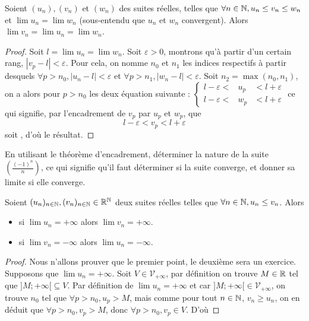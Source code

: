 \begin{them}[Encadrement]
    Soient $(u_n),(v_n)$ et $(w_n)$ des suites réelles, telles que $\forall n\in\mathbb{N}, u_n \leq v_n \leq w_n$ et $\lim u_n = \lim w_n$ (sous-entendu que $u_n$ et $w_n$ convergent). Alors $\lim v_n = \lim u_n = \lim w_n$.
\end{them}

\begin{proof}
    Soit $l = \lim u_n = \lim w_n$. Soit $\varepsilon > 0$, montrons qu'à partir d'un certain rang, $|v_p - l| < \varepsilon$. Pour cela, on nomme $n_0$ et $n_1$ les indices respectifs à partir desquels $\forall p > n_0, |u_n - l| < \varepsilon$ et $\forall p > n_1, |w_n - l| < \varepsilon$. Soit $n_2 = \max(n_0,n_1)$, on a alors pour $p > n_0$ les deux équation suivante : $\left\{\begin{array}{rcl}
        l-\varepsilon <& u_p &< l+\varepsilon\\
        l-\varepsilon <& w_p &< l+\varepsilon 
    \end{array}\right.$ ce qui signifie, par l'encadrement de $v_p$ par $u_p$ et $w_p$, que $$l-\varepsilon < v_p < l+\varepsilon$$ soit , d'où le résultat.
\end{proof}

\begin{exo}
    En utilisant le théorème d'encadrement, déterminer la nature de la suite $\displaystyle{\left(\frac{(-1)^n}{n}\right)}$, ce qui signifie qu'il faut déterminer si la suite converge, et donner sa limite si elle converge.
\end{exo}

\begin{them}
    Soient $(u_n)_{n\in\mathbb{N}},(v_n)_{n\in\mathbb{N}}\in\mathbb{R}^{\mathbb{N}}$ deux suites réelles telles que $\forall n\in\mathbb{N},u_n \leq v_n$. Alors
    \begin{itemize}[label=$\bullet$]
        \item si $\lim u_n = +\infty$ alors $\lim v_n = +\infty$.
        \item si $\lim v_n = -\infty$ alors $\lim u_n = -\infty$.
    \end{itemize}
\end{them}

\begin{proof}
    Nous n'allons prouver que le premier point, le deuxième sera un exercice. Supposons que $\lim u_n = +\infty$. Soit $V\in\mathcal V_{+\infty}$, par définition on trouve $M\in\mathbb{R}$ tel que $]M;+\infty[\subseteq V$. Par définition de $\lim u_n = +\infty$ et car $]M;+\infty[\in\mathcal V_{+\infty}$, on trouve $n_0$ tel que $\forall p > n_0, u_p > M$, mais comme pour tout $n\in\mathbb{N}$, $v_n\geq u_n$, on en déduit que $\forall p > n_0, v_p > M$, donc $\forall p > n_0, v_p\in V$. D'où 
\end{proof}

